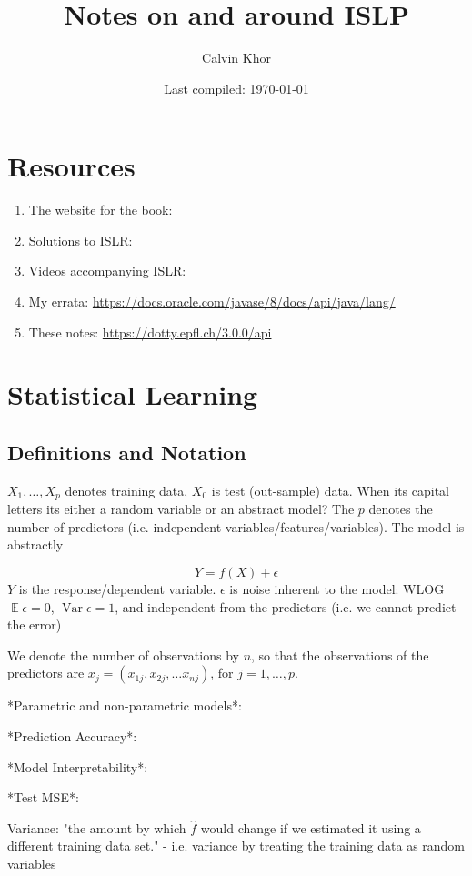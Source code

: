 \documentclass[11pt]{article}
\theoremstyle{definition}
\newcommand{\Var}{\operatorname{Var}}
\newcommand{\E}{\operatorname{\mathbb E}}
\begin{document}
\title{Notes on and around ISLP}
\author{Calvin Khor}

\date{Last compiled: \today}
\maketitle
\section{Resources}
\begin{enumerate}
	\item The website for the book:
	\item Solutions to ISLR:
	\item Videos accompanying ISLR:
    \item My errata: \url{https://docs.oracle.com/javase/8/docs/api/java/lang/}
    \item These notes: \url{https://dotty.epfl.ch/3.0.0/api}
\end{enumerate}

\section{Statistical Learning}
\subsection{Definitions and Notation}

 $X_1,\dots,X_p$ denotes training data, $X_0$ is test (out-sample) data. When its capital letters its either a random variable or an abstract model? The $p$ denotes the number of predictors (i.e. independent variables/features/variables). The model is abstractly

\[ Y=f(X)+\epsilon \tag{2.1} \]
$Y$ is the response/dependent variable. $\epsilon$ is noise inherent to the model: WLOG $ \E\epsilon=0$,  $\Var\epsilon = 1$, and independent from the predictors (i.e. we cannot predict the error)

We denote the number of observations by $n$, so that the observations of the predictors are $x_j=(x_{1j}, x_{2j},\dots x_{nj})$, for $j=1,\dots,p$.

*Parametric and non-parametric models*:

*Prediction Accuracy*:

*Model Interpretability*:

*Test MSE*:

Variance: "the amount by which $\hat f$ would change if we estimated it using a different training data set." - i.e. variance by treating the training data as random variables
\end{document}
